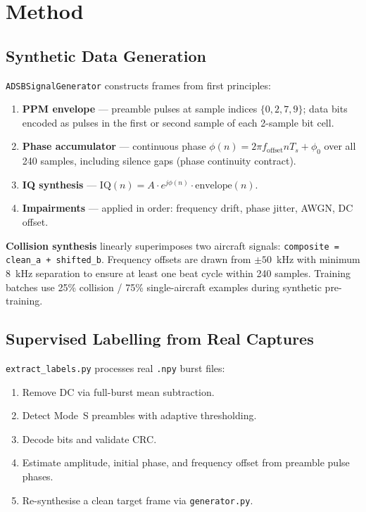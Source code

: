 \documentclass[11pt,a4paper]{article}
\begin{document}
\section{Method}

\subsection{Synthetic Data Generation}

\texttt{ADSBSignalGenerator} constructs frames from first principles:
\begin{enumerate}[leftmargin=*]
  \item \textbf{PPM envelope} --- preamble pulses at sample indices
        $\{0, 2, 7, 9\}$; data bits encoded as pulses in the first or second
        sample of each 2-sample bit cell.
  \item \textbf{Phase accumulator} --- continuous phase
        $\phi(n) = 2\pi f_{\mathrm{offset}} n T_s + \phi_0$ over all 240
        samples, including silence gaps (phase continuity contract).
  \item \textbf{IQ synthesis} ---
        $\mathrm{IQ}(n) = A \cdot e^{j\phi(n)} \cdot \mathrm{envelope}(n)$.
  \item \textbf{Impairments} --- applied in order: frequency drift, phase
        jitter, AWGN, DC offset.
\end{enumerate}

\textbf{Collision synthesis} linearly superimposes two aircraft signals:
\texttt{composite = clean\_a + shifted\_b}. Frequency offsets are drawn from
$\pm 50$~kHz with minimum 8~kHz separation to ensure at least one beat cycle
within 240 samples. Training batches use 25\% collision / 75\% single-aircraft
examples during synthetic pre-training.

\subsection{Supervised Labelling from Real Captures}

\texttt{extract\_labels.py} processes real \texttt{.npy} burst files:
\begin{enumerate}[leftmargin=*]
  \item Remove DC via full-burst mean subtraction.
  \item Detect Mode~S preambles with adaptive thresholding.
  \item Decode bits and validate CRC.
  \item Estimate amplitude, initial phase, and frequency offset from preamble
        pulse phases.
  \item Re-synthesise a clean target frame via \texttt{generator.py}.
\end{enumerate}
\end{document}
